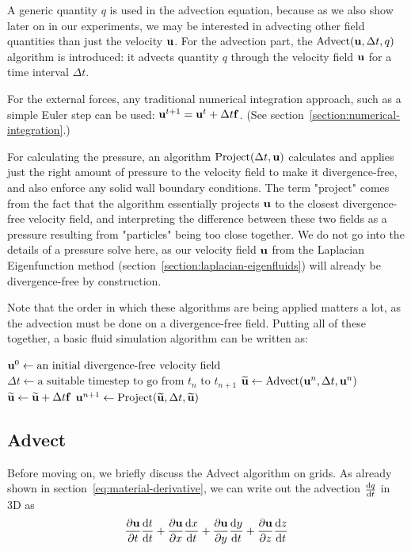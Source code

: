 A generic quantity $q$ is used in the advection equation, because as we also
show later on in our experiments, we may be interested in advecting other field
quantities than just the velocity $\vb{u}$. For the advection part, the
$\text{Advect}(\vb{u}, \Delta t, q)$ algorithm is introduced: it advects
quantity $q$ through the velocity field $\vb{u}$ for a time interval $\Delta t$. 

For the external forces, any traditional numerical integration approach, such as
a simple Euler step can be used: $\vb{u}^{t+1} = \vb{u}^t + \Delta t \vb{f}$.
(See section~\ref{section:numerical-integration}.)

For calculating the pressure, an algorithm $\text{Project}(\Delta t, \vb{u})$
calculates and applies just the right amount of pressure to the velocity field
to make it divergence-free, and also enforce any solid wall boundary
conditions. The term "project" comes from the fact that the algorithm
essentially projects $\vb{u}$ to the closest divergence-free velocity field, and
interpreting the difference between these two fields as a pressure resulting
from "particles" being too close together. We do not go into the details of a
pressure solve here, as our velocity field $\vb{u}$ from the Laplacian
Eigenfunction method (section~\ref{section:laplacian-eigenfluids}) will already
be divergence-free by construction. 

Note that the order in which these algorithms are being applied matters a lot,
as the advection must be done on a divergence-free field. Putting all of these
together, a basic fluid simulation algorithm can be written as:

\begin{algorithmic}
    \State $\vb{u}^0 \gets \text{an initial divergence-free velocity field}$
        \State $\Delta t 
            \gets \text{a suitable timestep to go from $t_n$ to $t_{n+1}$}$
        \State $\widetilde{\vb{u}} 
            \gets \text{Advect}(\vb{u}^n,\Delta t, \vb{u}^n)$
        \State $\widetilde{\vb{u}} 
            \gets \widetilde{\vb{u}} + \Delta t \vb{f}$
        \State $\vb{u}^{n+1}
        \gets \text{Project}(\widetilde{\vb{u}},\Delta t, \widetilde{\vb{u}})$
            \EndFor {}
\end{algorithmic}

\subsection*{Advect}
Before moving on, we briefly discuss the Advect algorithm on grids. As already
shown in section~\ref{eq:material-derivative}, we can write out the advection 
$\dv{q}{t}$ in 3D as
$$\pdv{\vb{u}}{t}\dv{t}{t} 
                    + \pdv{\vb{u}}{x}\dv{x}{t} 
                    + \pdv{\vb{u}}{y}\dv{y}{t} 
                    + \pdv{\vb{u}}{z}\dv{z}{t}$$

